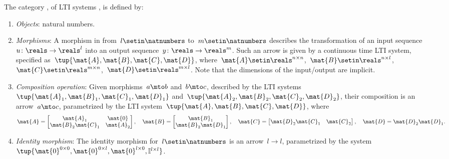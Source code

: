 \begin{ctdefinition}
    \label{def:Set}
    The category \LTI, of LTI systems \iindex{\LTI}, is defined by:
    \begin{enumerate}
        \item \emph{Objects}: natural numbers.
        \item \emph{Morphisms}: A morphism in \LTI from~$l\setin \natnumbers$ to~$m\setin \natnumbers$ describes the transformation of an input sequence~$u\colon \reals \to \reals^l$ into an output sequence~$y\colon \reals \to \reals^m$.
              Such an arrow is given by a continuous time LTI system, specified as~$\tup{\mat{A},\mat{B},\mat{C},\mat{D}}$, where~$\mat{A}\setin \reals^{n\times n}$,~$\mat{B}\setin \reals^{n\times l}$,~$\mat{C}\setin \reals^{m\times n}$,~$\mat{D}\setin \reals^{m\times l}$.
              Note that the dimensions of the input/output are implicit.
        \item \emph{Composition operation}: Given morphisms~$a\mto b$ and~$b\mto c$, described by the LTI systems~$\tup{\mat{A}_1,\mat{B}_1,\mat{C}_1,\mat{D}_1}$ and~$\tup{\mat{A}_2,\mat{B}_2,\mat{C}_2,\mat{D}_2}$, their composition is an arrow~$a\mto c$, parametrized by the LTI system~$\tup{\mat{A},\mat{B},\mat{C},\mat{D}}$, where
              \begin{equation}
                  \mat{A}=\begin{bmatrix}
                      \mat{A}_1          & \mat{0}   \\
                      \mat{B}_2\mat{C}_1 & \mat{A}_2
                  \end{bmatrix},\quad
                  \mat{B}=\begin{bmatrix}
                      \mat{B}_1 \\
                      \mat{B}_2\mat{D}_1
                  \end{bmatrix},\quad
                  \mat{C}=\begin{bmatrix}
                      \mat{D}_2\mat{C}_1 & \mat{C}_2
                  \end{bmatrix}, \quad
                  \mat{D}=\mat{D}_2\mat{D}_1.
              \end{equation}
        \item \emph{Identity morphism}: The identity morphism for~$l\setin \natnumbers$ is an arrow~$l\to l$, parametrized by the system~$\tup{\mat{0}^{0\times 0},\mat{0}^{0\times l},\mat{0}^{l\times 0},\mathbb{I}^{l\times l}}$.

    \end{enumerate}
\end{ctdefinition}


